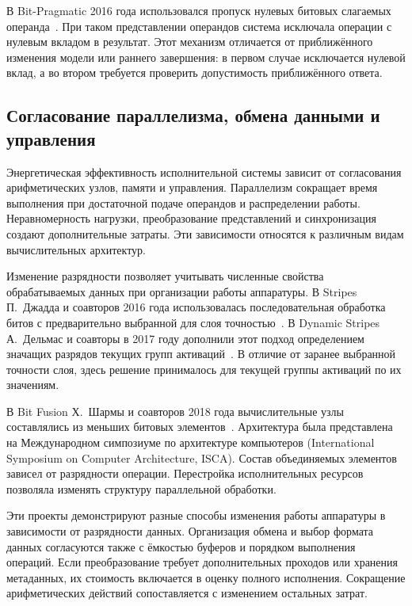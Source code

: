 В Bit-Pragmatic 2016 года использовался пропуск нулевых
битовых слагаемых операнда~\cite{pragmatic2016}.
При таком представлении операндов система исключала операции с нулевым вкладом
в результат. Этот механизм отличается
от приближённого изменения модели или раннего завершения:
в первом случае исключается нулевой вклад, а во втором требуется проверить
допустимость приближённого ответа.

\subsection{Согласование параллелизма, обмена данными и управления}

Энергетическая эффективность исполнительной системы зависит
от согласования арифметических узлов, памяти и управления.
Параллелизм сокращает время выполнения при достаточной
подаче операндов и распределении работы. Неравномерность
нагрузки, преобразование представлений и синхронизация
создают дополнительные затраты. Эти зависимости относятся
к различным видам вычислительных архитектур.

Изменение разрядности позволяет учитывать численные свойства обрабатываемых
данных при организации работы аппаратуры.
В Stripes П.~Джадда и соавторов 2016 года использовалась
последовательная обработка битов с предварительно выбранной
для слоя точностью~\cite{stripes2016}. В Dynamic Stripes
А.~Дельмас и соавторы в 2017 году дополнили этот подход
определением значащих разрядов текущих групп активаций~\cite{dynamic2017}.
В отличие от заранее выбранной точности слоя, здесь решение принималось для
текущей группы активаций по их значениям.

В Bit Fusion Х.~Шармы и соавторов 2018 года вычислительные
узлы составлялись из меньших битовых элементов~\cite{bitfusion2018}.
Архитектура была представлена на Международном симпозиуме
по архитектуре компьютеров (International Symposium on
Computer Architecture, ISCA). Состав объединяемых элементов
зависел от разрядности операции. Перестройка исполнительных
ресурсов позволяла изменять структуру параллельной обработки.

Эти проекты демонстрируют разные способы изменения работы аппаратуры в
зависимости от разрядности данных. Организация обмена и выбор формата данных
согласуются также с ёмкостью буферов и порядком выполнения
операций. Если преобразование требует дополнительных
проходов или хранения метаданных, их стоимость включается
в оценку полного исполнения. Сокращение арифметических
действий сопоставляется с изменением остальных затрат.

